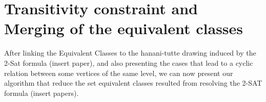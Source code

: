 
\chapter{Transitivity constraint and Merging of the equivalent classes}
\label{ch:RedEq}


After linking the Equivalent Classes to the hanani-tutte drawing induced by the 2-Sat formula (insert paper), and also presenting 
the cases that lead to a cyclic relation between some vertices of the same level, we can now present 
our algorithm that reduce the set equivalent classes resulted from resolving the 2-SAT formula (insert papers). 

%
%   
%

